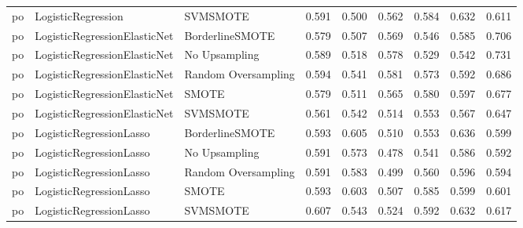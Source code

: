 \begin{tabular}{lllllllll}
      po &           LogisticRegression &            SVMSMOTE & 0.591 &                     0.500 &                 0.562 &                  0.584 &                                   0.632 &     0.611 \\
      po & LogisticRegressionElasticNet &     BorderlineSMOTE & 0.579 &                     0.507 &                 0.569 &                  0.546 &                                   0.585 &     0.706 \\
      po & LogisticRegressionElasticNet &       No Upsampling & 0.589 &                     0.518 &                 0.578 &                  0.529 &                                   0.542 &     0.731 \\
      po & LogisticRegressionElasticNet & Random Oversampling & 0.594 &                     0.541 &                 0.581 &                  0.573 &                                   0.592 &     0.686 \\
      po & LogisticRegressionElasticNet &               SMOTE & 0.579 &                     0.511 &                 0.565 &                  0.580 &                                   0.597 &     0.677 \\
      po & LogisticRegressionElasticNet &            SVMSMOTE & 0.561 &                     0.542 &                 0.514 &                  0.553 &                                   0.567 &     0.647 \\
      po &      LogisticRegressionLasso &     BorderlineSMOTE & 0.593 &                     0.605 &                 0.510 &                  0.553 &                                   0.636 &     0.599 \\
      po &      LogisticRegressionLasso &       No Upsampling & 0.591 &                     0.573 &                 0.478 &                  0.541 &                                   0.586 &     0.592 \\
      po &      LogisticRegressionLasso & Random Oversampling & 0.591 &                     0.583 &                 0.499 &                  0.560 &                                   0.596 &     0.594 \\
      po &      LogisticRegressionLasso &               SMOTE & 0.593 &                     0.603 &                 0.507 &                  0.585 &                                   0.599 &     0.601 \\
      po &      LogisticRegressionLasso &            SVMSMOTE & 0.607 &                     0.543 &                 0.524 &                  0.592 &                                   0.632 &     0.617 \\

\end{tabular}
